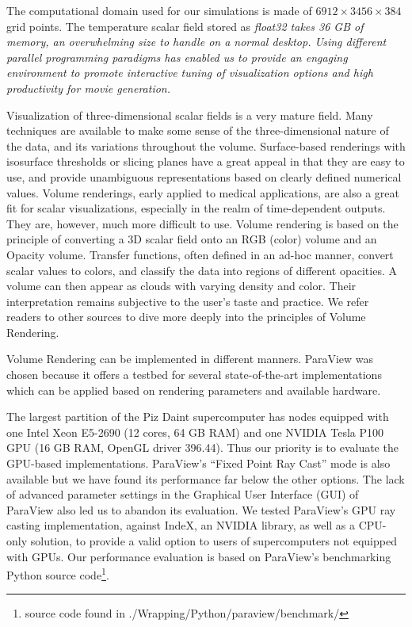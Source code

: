 \documentclass[5p,times]{elsarticle}
\begin{document}
The computational domain  used for our simulations is made of $ 6912 \times 3456 \times 384 $ grid points.
The temperature scalar field stored as \it{float32} \rm takes 36 GB of memory, an
overwhelming size to handle on a normal desktop. Using different parallel programming
paradigms has enabled us to provide an engaging environment to promote interactive tuning of
visualization options and high productivity for movie generation.

Visualization of three-dimensional scalar fields is a very mature field. Many techniques are
available to make some sense of the three-dimensional nature of the data, and its variations
throughout the volume. Surface-based renderings with isosurface thresholds or
slicing planes have a great appeal in that they are easy to use, and provide unambiguous
representations based on clearly defined numerical values. Volume renderings, early applied
to medical applications, are also a great fit for scalar visualizations, especially in the
realm of time-dependent outputs. They are, however, much more difficult to use. Volume rendering is
based on the principle of converting a 3D scalar field onto an RGB (color) volume and an Opacity volume.
Transfer functions, often defined in an ad-hoc manner, convert scalar values to colors, and classify
the data into regions of different opacities. A volume can then appear as clouds with varying density and color.
Their interpretation remains subjective to the user's taste and practice.
We refer readers to other sources \cite{VTKTextbook} to dive more deeply into the principles of Volume Rendering.

Volume Rendering can be implemented in different manners. ParaView was chosen because it offers a testbed
for several state-of-the-art implementations which can be applied based on rendering parameters and
available hardware.

The largest partition of the Piz Daint supercomputer has nodes equipped
with one Intel Xeon E5-2690 (12 cores, 64 GB RAM) and one NVIDIA
Tesla P100 GPU (16 GB RAM, OpenGL driver 396.44). Thus our priority is to evaluate
the GPU-based implementations.
ParaView's ``Fixed Point Ray Cast'' mode is also available but we have found its performance far
below the other options. The lack of advanced parameter settings in the Graphical
User Interface (GUI) of ParaView also led us to abandon its evaluation. We tested ParaView's GPU
ray casting implementation, against IndeX, an NVIDIA library, as well as a CPU-only solution,
to provide a valid option to users of supercomputers not equipped with GPUs.
Our performance evaluation is based on ParaView's benchmarking Python source
code\footnote{source code found in ./Wrapping/Python/paraview/benchmark/}.
\end{document}
